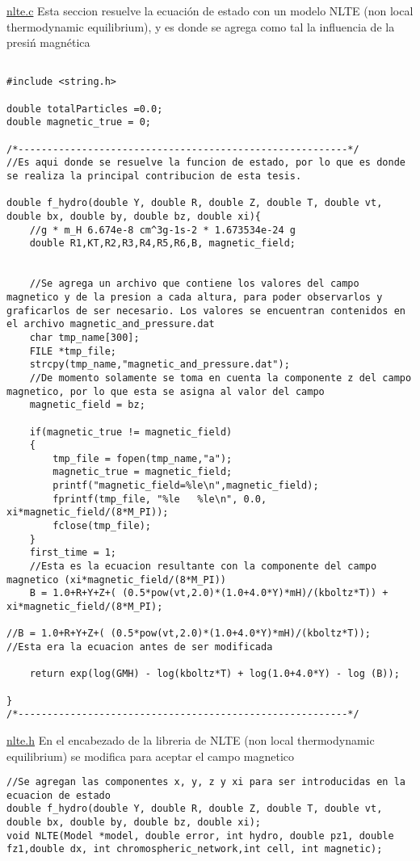 \underline{nlte.c}
Esta seccion resuelve la ecuaci\'on de estado con un modelo NLTE (non local thermodynamic equilibrium), y es donde se agrega como tal la influencia de la presi\'n magn\'etica
\begin{lstlisting}[style=CStyle]

#include <string.h>

double totalParticles =0.0;
double magnetic_true = 0;

/*---------------------------------------------------------*/
//Es aqui donde se resuelve la funcion de estado, por lo que es donde se realiza la principal contribucion de esta tesis.

double f_hydro(double Y, double R, double Z, double T, double vt, double bx, double by, double bz, double xi){
	//g * m_H 6.674e-8 cm^3g-1s-2 * 1.673534e-24 g
	double R1,KT,R2,R3,R4,R5,R6,B, magnetic_field;


	//Se agrega un archivo que contiene los valores del campo magnetico y de la presion a cada altura, para poder observarlos y graficarlos de ser necesario. Los valores se encuentran contenidos en el archivo magnetic_and_pressure.dat
	char tmp_name[300];
	FILE *tmp_file;
	strcpy(tmp_name,"magnetic_and_pressure.dat");
	//De momento solamente se toma en cuenta la componente z del campo magnetico, por lo que esta se asigna al valor del campo
	magnetic_field = bz;

	if(magnetic_true != magnetic_field)
	{
		tmp_file = fopen(tmp_name,"a");
		magnetic_true = magnetic_field;
		printf("magnetic_field=%le\n",magnetic_field);
		fprintf(tmp_file, "%le   %le\n", 0.0, xi*magnetic_field/(8*M_PI));
		fclose(tmp_file);
	}
	first_time = 1;
	//Esta es la ecuacion resultante con la componente del campo magnetico (xi*magnetic_field/(8*M_PI))
	B = 1.0+R+Y+Z+( (0.5*pow(vt,2.0)*(1.0+4.0*Y)*mH)/(kboltz*T)) + xi*magnetic_field/(8*M_PI);

//B = 1.0+R+Y+Z+( (0.5*pow(vt,2.0)*(1.0+4.0*Y)*mH)/(kboltz*T));
//Esta era la ecuacion antes de ser modificada

	return exp(log(GMH) - log(kboltz*T) + log(1.0+4.0*Y) - log (B));

}
/*---------------------------------------------------------*/

\end{lstlisting}

\underline{nlte.h}
En el encabezado de la libreria de NLTE (non local thermodynamic equilibrium) se modifica para aceptar el campo magnetico
\begin{lstlisting}[style=CStyle]
//Se agregan las componentes x, y, z y xi para ser introducidas en la ecuacion de estado
double f_hydro(double Y, double R, double Z, double T, double vt, double bx, double by, double bz, double xi);
void NLTE(Model *model, double error, int hydro, double pz1, double fz1,double dx, int chromospheric_network,int cell, int magnetic);
\end{lstlisting}

